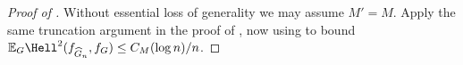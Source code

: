 \documentclass[letterpaper,11pt]{article}
\newcommand{\Expect}{\mathbb{E}}
\theoremstyle{definition}
\renewcommand{\hat}{\widehat}
\begin{document}
\begin{proof}[Proof of ]
Without essential loss of generality we may assume $M'=M$.
Apply the same truncation argument in the proof of , now
using  to bound
$\Expect_G\Hell^2(f_{\hat G_n},f_G)\le C_M(\log n)/n$.
\end{proof}





    
    

    
\end{document}
